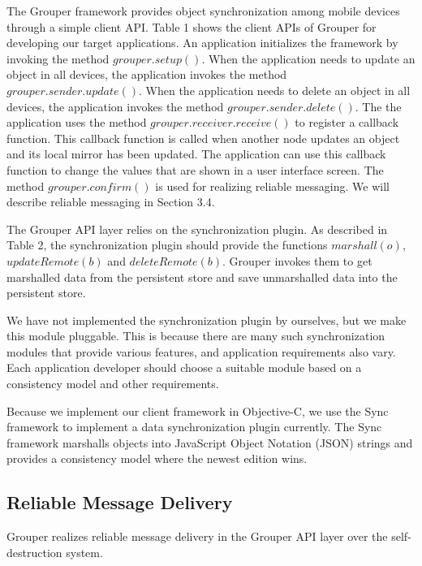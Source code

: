 The Grouper framework provides object synchronization among mobile devices through a simple client API.
Table 1 shows the client APIs of Grouper for developing our target applications.
An application initializes the framework by invoking the method $grouper.setup()$.
When the application needs to update an object in all devices, the application invokes the method $grouper.sender.update()$.
When the application needs to delete an object in all devices, the application invokes the method $grouper.sender.delete()$.
The the application uses the method $grouper.receiver.receive()$ to register a callback function.
This callback function is called when another node updates an object and its local mirror has been updated.
The application can use this callback function to change the values that are shown in a user interface screen.
The method $grouper.confirm()$ is used for realizing reliable messaging.
We will describe reliable messaging in Section 3.4.

The Grouper API layer relies on the synchronization plugin.
As described in Table 2, the synchronization plugin should provide the functions $marshall(o)$, $updateRemote(b)$ and $deleteRemote(b)$.
Grouper invokes them to get marshalled data from the persistent store and save unmarshalled data into the persistent store.

We have not implemented the synchronization plugin by ourselves, but we make this module pluggable.
This is because there are many such synchronization modules that provide various features, and application requirements also vary.
Each application developer should choose a suitable module based on a consistency model and other requirements.

Because we implement our client framework in Objective-C, we use the Sync framework\cite{sync} to implement a data synchronization plugin currently.
The Sync framework marshalls objects into JavaScript Object Notation (JSON) strings and provides a consistency model where the newest edition wins.

\subsection{Reliable Message Delivery}

Grouper realizes reliable message delivery in the Grouper API layer over the self-destruction system.

